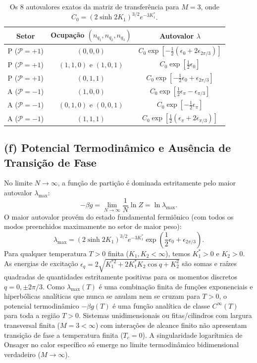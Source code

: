 \documentclass[11pt,a4paper]{article}
\begin{document}
\begin{table}[h!]
\centering
\begin{tabular}{|c|c|c|}
\hline
\textbf{Setor} & \textbf{Ocupação $(n_{q_1}, n_{q_2}, n_{q_3})$} & \textbf{Autovalor} $\lambda$ \\ \hline
P ($\mathcal{P}=+1$) & $(0,0,0)$ & $C_0 \exp\left[ -\frac{1}{2}(\epsilon_0 + 2\epsilon_{2\pi/3}) \right]$ \\
P ($\mathcal{P}=+1$) & $(1,1,0)$ e $(1,0,1)$ & $C_0 \exp\left[ \frac{1}{2}\epsilon_0 \right]$ \\
P ($\mathcal{P}=+1$) & $(0,1,1)$ & $C_0 \exp\left[ -\frac{1}{2}\epsilon_0 + \epsilon_{2\pi/3} \right]$ \\ \hline
A ($\mathcal{P}=-1$) & $(1,0,0)$ & $C_0 \exp\left[ \frac{1}{2}\epsilon_\pi - \epsilon_{\pi/3} \right]$ \\
A ($\mathcal{P}=-1$) & $(0,1,0)$ e $(0,0,1)$ & $C_0 \exp\left[ -\frac{1}{2}\epsilon_\pi \right]$ \\
A ($\mathcal{P}=-1$) & $(1,1,1)$ & $C_0 \exp\left[ \frac{1}{2}(\epsilon_\pi + 2\epsilon_{\pi/3}) \right]$ \\ \hline
\end{tabular}
\caption{Os 8 autovalores exatos da matriz de transferência para $M=3$, onde $C_0 = (2\sinh 2K_1)^{3/2} e^{-3K_1^*}$.}
\end{table}
%
\subsection*{(f) Potencial Termodinâmico e Ausência de Transição de Fase}
%
No limite $N \to \infty$, a função de partição é dominada estritamente pelo maior autovalor $\lambda_{\max}$:
%
\begin{equation}
    -\beta g = \lim_{N\to\infty} \frac{1}{N} \ln Z = \ln \lambda_{\max}.
\end{equation}
%
O maior autovalor provém do estado fundamental fermiônico (com todos os modos preenchidos maximamente no setor de maior peso):
%
\begin{equation}
    \lambda_{\max} = (2\sinh 2K_1)^{3/2} e^{-3K_1^*} \exp\left( \frac{1}{2}\epsilon_0 + \epsilon_{2\pi/3} \right).
\end{equation}
%
Para qualquer temperatura $T > 0$ finita ($K_1, K_2 < \infty$), temos $K_1^* > 0$ e $K_2 > 0$. As energias de excitação $\epsilon_q = 2\sqrt{K_1^{*2} + 2K_1^* K_2 \cos q + K_2^2}$ são somas e raízes quadradas de quantidades estritamente positivas para os momentos discretos $q = 0, \pm 2\pi/3$. Como $\lambda_{\max}(T)$ é uma combinação finita de funções exponenciais e hiperbólicas analíticas que nunca se anulam nem se cruzam para $T > 0$, o potencial termodinâmico $-\beta g(T)$ é uma função analítica de classe $C^\infty(T)$ para toda a região $T > 0$. Sistemas unidimensionais ou fitas/cilindros com largura transversal finita ($M = 3 < \infty$) com interações de alcance finito não apresentam transição de fase a temperatura finita ($T_c = 0$). A singularidade logarítmica de Onsager no calor específico só emerge no limite termodinâmico bidimensional verdadeiro ($M \to \infty$).
\end{document}
